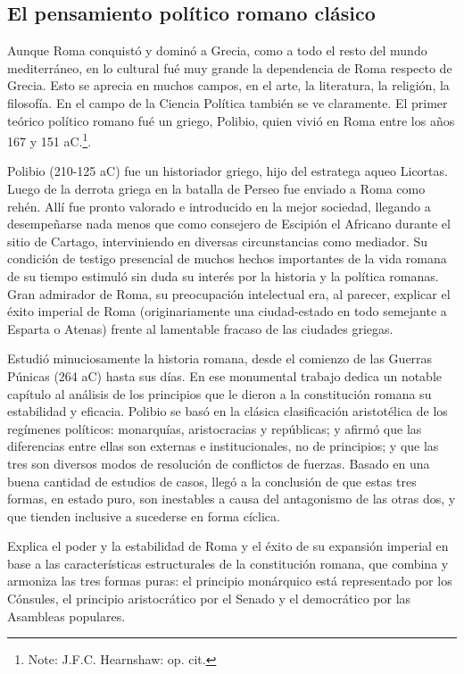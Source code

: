 \documentclass[
]{book}
\begin{document}
\hypertarget{el-pensamiento-poluxedtico-romano-cluxe1sico}{%
\subsection*{El pensamiento político romano clásico}\label{el-pensamiento-poluxedtico-romano-cluxe1sico}}

Aunque Roma conquistó y dominó a Grecia, como a todo el resto del mundo mediterráneo, en lo cultural fué muy grande la dependencia de Roma respecto de Grecia. Esto se aprecia en muchos campos, en el arte, la literatura, la religión, la filosofía. En el campo de la Ciencia Política también se ve claramente. El primer teórico político romano fué un griego, Polibio, quien vivió en Roma entre los años 167 y 151 aC.\footnote{Note: J.F.C. Hearnshaw: op. cit.}.

Polibio (210-125 aC) fue un historiador griego, hijo del estratega aqueo Licortas. Luego de la derrota griega en la batalla de Perseo fue enviado a Roma como rehén. Allí fue pronto valorado e introducido en la mejor sociedad, llegando a desempeñarse nada menos que como consejero de Escipión el Africano durante el sitio de Cartago, interviniendo en diversas circunstancias como mediador. Su condición de testigo presencial de muchos hechos importantes de la vida romana de su tiempo estimuló sin duda su interés por la historia y la política romanas. Gran admirador de Roma, su preocupación intelectual era, al parecer, explicar el éxito imperial de Roma (originariamente una ciudad-estado en todo semejante a Esparta o Atenas) frente al lamentable fracaso de las ciudades griegas.

Estudió minuciosamente la historia romana, desde el comienzo de las Guerras Púnicas (264 aC) hasta sus días. En ese monumental trabajo dedica un notable capítulo al análisis de los principios que le dieron a la constitución romana su estabilidad y eficacia. Polibio se basó en la clásica clasificación aristotélica de los regímenes políticos: monarquías, aristocracias y repúblicas; y afirmó que las diferencias entre ellas son externas e institucionales, no de principios; y que las tres son diversos modos de resolución de conflictos de fuerzas. Basado en una buena cantidad de estudios de casos, llegó a la conclusión de que estas tres formas, en estado puro, son inestables a causa del antagonismo de las otras dos, y que tienden inclusive a sucederse en forma cíclica.

Explica el poder y la estabilidad de Roma y el éxito de su expansión imperial en base a las características estructurales de la constitución romana, que combina y armoniza las tres formas puras: el principio monárquico está representado por los Cónsules, el principio aristocrático por el Senado y el democrático por las Asambleas populares.
\end{document}
